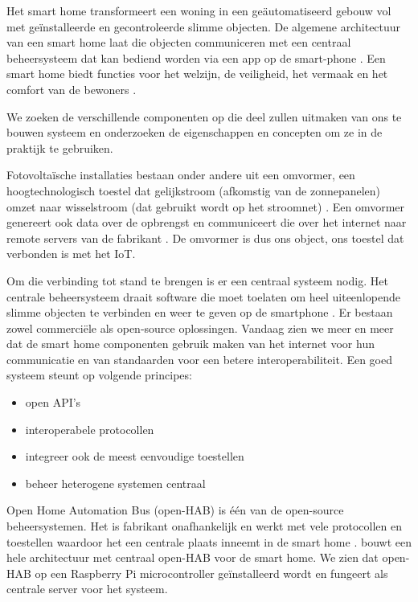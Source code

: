 \documentclass{hogent-article}
\begin{document}
    Het smart home transformeert een woning in een geäutomatiseerd gebouw vol met geïnstalleerde en gecontroleerde slimme objecten. De algemene architectuur van een smart home laat die objecten communiceren met een centraal beheersysteem dat kan bediend worden via een app op de smart-phone \autocite{Kassab2020}. Een smart home biedt functies voor het welzijn, de veiligheid, het vermaak en het comfort van de bewoners \autocite{Choi2021}.

    We zoeken de verschillende componenten op die deel zullen uitmaken van ons te bouwen systeem en onderzoeken de eigenschappen en concepten om ze in de praktijk te gebruiken.
    
    Fotovoltaïsche installaties bestaan onder andere uit een omvormer, een hoogtechnologisch toestel dat gelijkstroom (afkomstig van de zonnepanelen) omzet naar wisselstroom (dat gebruikt wordt op het stroomnet) \autocite{Teodorescu2011}. Een omvormer genereert ook data over de opbrengst en communiceert die over het internet naar remote servers van de fabrikant \autocite{Fusionsolar2021}. De omvormer is dus ons object, ons toestel dat verbonden is met het IoT.
    
    Om die verbinding tot stand te brengen is er een centraal systeem nodig. Het centrale beheersysteem draait software die moet toelaten om heel uiteenlopende slimme objecten te verbinden en weer te geven op de smartphone \autocite{Setz2021}. Er bestaan zowel commerciële als open-source oplossingen. Vandaag zien we meer en meer dat de smart home componenten gebruik maken van het internet voor hun communicatie en van standaarden voor een betere interoperabiliteit. Een goed systeem steunt op volgende principes: \begin{itemize}
        \item open API's
        \item interoperabele protocollen
        \item integreer ook de meest eenvoudige toestellen
        \item beheer heterogene systemen centraal
    \end{itemize}

    Open Home Automation Bus (open-HAB) is één van de open-source beheersystemen. Het is fabrikant onafhankelijk en werkt met vele protocollen en toestellen waardoor het een centrale plaats inneemt in de smart home \autocite{Domb2019}. \textcite{Sowah2020} bouwt een hele architectuur met centraal open-HAB voor de smart home. We zien dat open-HAB op een Raspberry Pi microcontroller geïnstalleerd wordt en fungeert als centrale server voor het systeem.
    
\end{document}
